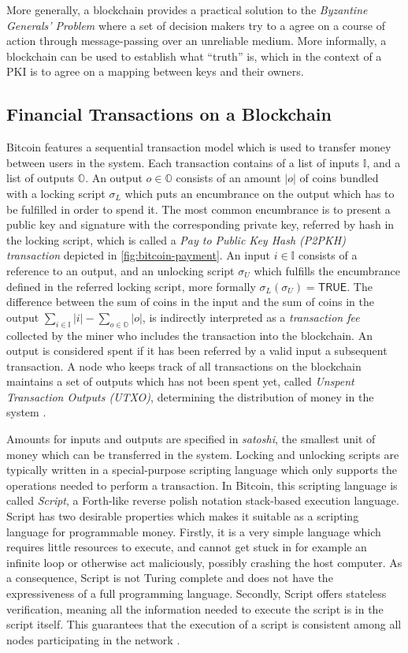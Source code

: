 \documentclass{style/kththesis}
\begin{document}
More generally, a blockchain provides a practical solution to the \emph{Byzantine Generals' Problem} \cite{Lamport82} where a set of decision makers try to a agree on a course of action through message-passing over an unreliable medium. More informally, a blockchain can be used to establish what ``truth'' is, which in the context of a PKI is to agree on a mapping between keys and their owners.

\subsection{Financial Transactions on a Blockchain}
\label{blockchain-transactions}
Bitcoin features a sequential transaction model which is used to transfer money between users in the system. Each transaction contains of a list of inputs $\mathbb{I}$, and a list of outputs $\mathbb{O}$. An output $o \in \mathbb{O}$ consists of an amount $|o|$ of coins bundled with a locking script $\sigma_{L}$ which puts an encumbrance on the output which has to be fulfilled in order to spend it. The most common encumbrance is to present a public key and signature with the corresponding private key, referred by hash in the locking script, which is called a \emph{Pay to Public Key Hash (P2PKH) transaction} depicted in \cref{fig:bitcoin-payment}. An input $i \in \mathbb{I}$ consists of a reference to an output, and an unlocking script $\sigma_{U}$ which fulfills the encumbrance defined in the referred locking script, more formally $\sigma_{L}(\sigma_{U}) = \mathsf{TRUE}$. The difference between the sum of coins in the input and the sum of coins in the output $\sum_{i \in \mathbb{I}}{|i|}-\sum_{o \in \mathbb{O}}{|o|}$, is indirectly interpreted as a \emph{transaction fee} collected by the miner who includes the transaction into the blockchain. An output is considered spent if it has been referred by a valid input a subsequent transaction. A node who keeps track of all transactions on the blockchain maintains a set of outputs which has not been spent yet, called \emph{Unspent Transaction Outputs (UTXO)}, determining the distribution of money in the system \cite{Antonopoulos14}.

Amounts for inputs and outputs are specified in \textit{satoshi}, the smallest unit of money which can be transferred in the system. Locking and unlocking scripts are typically written in a special-purpose scripting language which only supports the operations needed to perform a transaction. In Bitcoin, this scripting language is called \textit{Script}, a Forth-like reverse polish notation stack-based execution language. Script has two desirable properties which makes it suitable as a scripting language for programmable money. Firstly, it is a very simple language which requires little resources to execute, and cannot get stuck in for example an infinite loop or otherwise act maliciously, possibly crashing the host computer. As a consequence, Script is not Turing complete and does not have the expressiveness of a full programming language. Secondly, Script offers stateless verification, meaning all the information needed to execute the script is in the script itself. This guarantees that the execution of a script is consistent among all nodes participating in the network \cite{Antonopoulos14}.
\end{document}
